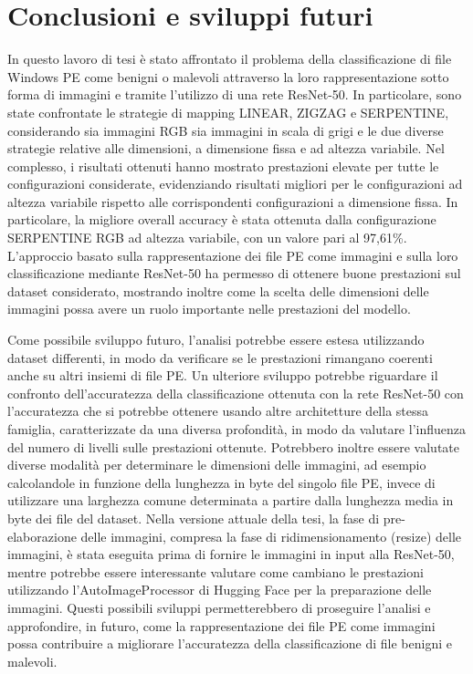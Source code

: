 \chapter{Conclusioni e sviluppi futuri}

In questo lavoro di tesi è stato affrontato il problema della classificazione
di file Windows PE come benigni o malevoli attraverso la loro
rappresentazione sotto forma di immagini e tramite l'utilizzo di una rete
ResNet-50. In particolare, sono state confrontate le strategie di
mapping LINEAR, ZIGZAG e SERPENTINE, considerando sia immagini RGB
sia immagini in scala di grigi e le due diverse strategie relative alle
dimensioni, a dimensione fissa e ad altezza variabile.
Nel complesso, i risultati ottenuti hanno mostrato prestazioni
elevate per tutte le configurazioni considerate, evidenziando
risultati migliori per le configurazioni ad altezza variabile
rispetto alle corrispondenti configurazioni a dimensione fissa.
In particolare, la migliore overall accuracy è stata ottenuta
dalla configurazione SERPENTINE RGB ad altezza variabile, con un
valore pari al 97,61\%.
L'approccio basato sulla rappresentazione dei file PE come immagini
e sulla loro classificazione mediante ResNet-50 ha permesso di
ottenere buone prestazioni sul dataset considerato, mostrando inoltre
come la scelta delle dimensioni delle immagini possa avere un ruolo
importante nelle prestazioni del modello.

Come possibile sviluppo futuro, l'analisi potrebbe essere estesa
utilizzando dataset differenti, in modo da verificare se le
prestazioni rimangano coerenti anche su altri insiemi di file PE.
Un ulteriore sviluppo potrebbe riguardare il confronto
dell'accuratezza della classificazione ottenuta con la rete
ResNet-50 con l'accuratezza che si potrebbe ottenere usando altre architetture della stessa
famiglia, caratterizzate da una diversa profondità, in modo da
valutare l'influenza del numero di livelli sulle prestazioni ottenute.
Potrebbero inoltre essere valutate diverse modalità per determinare
le dimensioni delle immagini, ad esempio calcolandole in funzione
della lunghezza in byte del singolo file PE, invece di utilizzare
una larghezza comune determinata a partire dalla lunghezza media in
byte dei file del dataset.
Nella versione attuale della tesi, la fase di pre-elaborazione
delle immagini, compresa la fase di ridimensionamento (resize)
delle immagini, è stata eseguita prima di fornire
le immagini in input alla ResNet-50, mentre potrebbe essere interessante valutare come cambiano
le prestazioni utilizzando l'AutoImageProcessor di Hugging Face
\cite{huggingface_autoimageprocessor} per la preparazione delle
immagini.
Questi possibili sviluppi permetterebbero di proseguire l'analisi e
approfondire, in futuro, come la rappresentazione dei file PE come
immagini possa contribuire a migliorare l'accuratezza della classificazione di file benigni e malevoli.